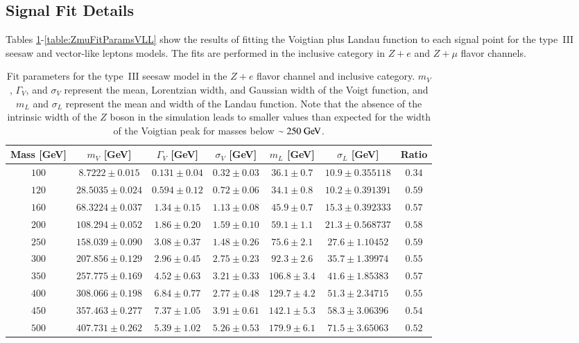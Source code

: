 \subsection{Signal Fit Details}\label{sec:appendix-resonance-signal-fits}
Tables \ref{table:ZeFitParamsSS}-\ref{table:ZmuFitParamsVLL} show the results of fitting the Voigtian plus Landau function to each signal point for the type~III seesaw and vector-like leptons models. The fits are performed in the inclusive category in $Z+e$ and $Z+\mu$ flavor channels.  


\begin{table}[h]
 \centering
\scriptsize
\caption{Fit parameters for the type~III seesaw model in the $Z+e$ flavor channel and inclusive category. $m_V$, $\Gamma_V$, and $\sigma_V$ represent the mean, Lorentzian width, and Gaussian width of the Voigt function, and $m_L$ and $\sigma_L$ represent the mean and width of the Landau function. Note that the absence of the intrinsic width of the $Z$ boson in the simulation leads to smaller values than expected for the width of the Voigtian peak for masses below $\sim250 \GeV$.}
 \begin{tabular}{|c||c|c|c|c|c|c|}  
 \hline\hline
Mass [GeV] & $m_V$ [GeV] &  $\Gamma_V$ [GeV] &  $\sigma_V$ [GeV] & $m_L$  [GeV] & $\sigma_L$ [GeV] & Ratio\\
\hline \hline
$100 $&$ 8.7222   \pm0.015 $&$ 0.131 \pm0.04 $&$ 0.32\pm0.03 $&$ 36.1\pm0.7 $&$ 10.9\pm0.355118 $&$ 0.34$ \\ 
$120 $&$ 28.5035 \pm0.024 $&$ 0.594\pm0.12 $&$ 0.72\pm0.06 $&$ 34.1\pm0.8 $&$ 10.2\pm0.391391 $&$ 0.59$ \\
$160 $&$ 68.3224 \pm0.037 $&$ 1.34\pm0.15 $&$ 1.13\pm0.08 $&$ 45.9\pm0.7 $&$ 15.3\pm0.392333 $&$ 0.57 $\\
$200 $&$ 108.294 \pm0.052 $&$ 1.86\pm0.20 $&$ 1.59\pm0.10 $&$ 59.1\pm1.1 $&$ 21.3\pm0.568737 $&$ 0.58 $\\
$250 $&$ 158.039 \pm0.090 $&$ 3.08\pm0.37 $&$ 1.48\pm0.26 $&$ 75.6\pm2.1 $&$ 27.6\pm1.10452 $&$ 0.59$ \\ 
$300 $&$ 207.856 \pm0.129 $&$ 2.96\pm0.45 $&$ 2.75\pm0.23 $&$ 92.3\pm2.6 $&$ 35.7\pm1.39974 $&$ 0.55 $\\ 
$350 $&$ 257.775\pm0.169 $&$ 4.52\pm0.63 $&$ 3.21\pm0.33 $&$ 106.8\pm3.4 $&$ 41.6\pm1.85383 $&$ 0.57$ \\ 
$400 $&$ 308.066\pm0.198 $&$ 6.84\pm0.77 $&$ 2.77\pm0.48 $&$ 129.7\pm4.2 $&$ 51.3\pm2.34715 $&$ 0.55 $\\ 
$450 $&$ 357.463\pm0.277 $&$ 7.37\pm1.05 $&$ 3.91\pm0.61 $&$ 142.1\pm5.3 $&$ 58.3\pm3.06396 $&$ 0.54$ \\ 
$500 $&$ 407.731\pm0.262 $&$ 5.39\pm1.02 $&$ 5.26\pm0.53 $&$ 179.9\pm6.1 $&$ 71.5\pm3.65063   $&$ 0.52 $ \\
\hline\hline
\end{tabular} 
   \label{table:ZeFitParamsSS}
\end{table}


